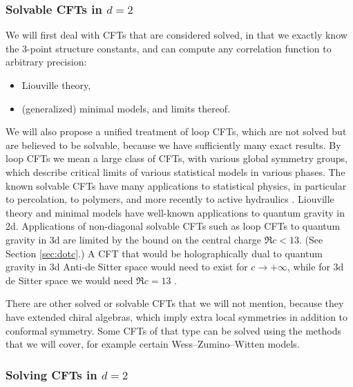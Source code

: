 \documentclass[12pt, a4paper]{article}
\begin{document}
 
\subsubsection*{Solvable CFTs in $d=2$}

We will first deal with CFTs that are considered solved, in that we exactly know the 3-point structure constants, and can compute any correlation function to arbitrary precision:
\begin{itemize}
 \item Liouville theory,
 \item (generalized) minimal models, and limits thereof. 
\end{itemize}
We will also propose a unified treatment of loop CFTs, which are not solved but are believed to be solvable, because we have sufficiently many exact results. By loop CFTs we mean a large class of CFTs, with various global symmetry groups, which describe critical limits of various statistical models in various phases. The known solvable CFTs have many applications to statistical physics, in particular to percolation, to polymers, and more recently to active hydraulics \cite{jcpb23}. Liouville theory and minimal models have well-known applications to quantum gravity in 2d. Applications of non-diagonal solvable CFTs such as loop CFTs to quantum gravity in 3d are limited by the bound on the central charge $\Re c < 13$. (See Section \ref{sec:dotc}.) A CFT that would be holographically dual to quantum gravity in 3d Anti-de Sitter space would need to exist for $c\to+\infty$, while for 3d de Sitter space we would need $\Re c = 13$ \cite{god24, cemr24}. 

There are other solved or solvable CFTs that we will not mention, because they have extended chiral algebras, which imply extra local symmetries in addition to conformal symmetry. Some CFTs of that type can be solved using the methods that we will cover, for example certain Wess--Zumino--Witten models. 

\subsubsection*{Solving CFTs in $d=2$}
\end{document}
